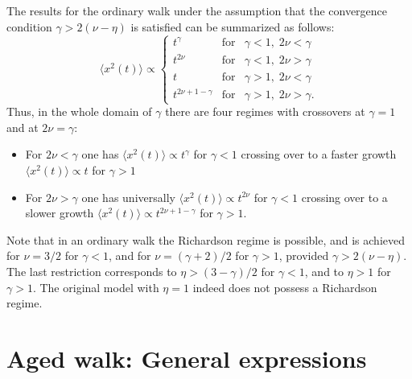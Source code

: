 The results for the ordinary walk under the assumption that the convergence condition $\gamma > 2(\nu-\eta)$ is satisfied can be summarized as follows: 
\begin{equation}
\langle x^2(t) \rangle \propto \left\{
  \begin{array}{lll}
  t^{\gamma} & \mathrm{for} & \gamma < 1, \; 2\nu < \gamma \\
t^{2\nu} & \mathrm{for} & \gamma < 1, \; 2\nu > \gamma \\
t & \mathrm{for} & \gamma > 1, \; 2\nu < \gamma \\
t^{2\nu+1- \gamma  } &\mathrm{for} &  \gamma > 1, \;2\nu > \gamma .
  \end{array}
  \right.
\label{balpoint}
\end{equation}
Thus, in the whole domain of $\gamma$ there are four regimes with crossovers at $\gamma = 1$ and at $2\nu = \gamma$:
\begin{itemize}
 \item For $2\nu < \gamma$ one has $\langle x^2(t) \rangle \propto t^{\gamma}$ for $\gamma <1$ crossing over to a faster growth $\langle x^2(t) \rangle \propto t$ for $\gamma > 1$
 \item For $2\nu > \gamma$ one has universally $\langle x^2(t) \rangle \propto t^{2\nu}$ for $\gamma <1$ crossing over to a slower growth $\langle x^2(t) \rangle \propto t^{2\nu+1-\gamma}$ for $\gamma > 1$.
\end{itemize}
Note that in an ordinary walk the Richardson regime is possible, and is achieved for $\nu = 3/2$ for $\gamma <1$, and for $\nu = (\gamma + 2)/2$ for $\gamma > 1$, provided $\gamma > 2(\nu - \eta)$. 
The last restriction corresponds to $\eta > (3-\gamma)/2$ for $\gamma <1$, and to $\eta >1$ for $\gamma > 1$. The original model with $\eta =1$ indeed does not possess a Richardson regime. 

\section{Aged walk: General expressions \label{Sec:Aged}}

